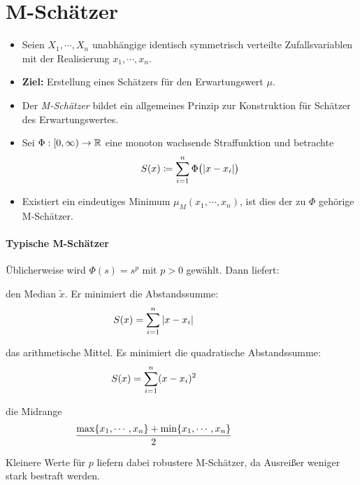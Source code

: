 	\section{M-Schätzer}
		\begin{itemize}
			\item Seien \( X_1, \cdots, X_n \) unabhängige identisch symmetrisch verteilte Zufallsvariablen mit der Realisierung \(x_1, \cdots, x_n\).
			\item \textbf{Ziel:} Erstellung eines Schätzers für den Erwartungswert \(\mu\).
			\item Der \textit{M-Schätzer} bildet ein allgemeines Prinzip zur Konstruktion für Schätzer des Erwartungswertes.
			\item Sei \( \Phi : [0, \infty) \rightarrow \mathbb{R} \) eine monoton wachsende Straffunktion und betrachte
				\begin{equation*}
					S(x) \coloneqq \sum_{i = 1}^{n} \Phi\big( \abs{x - x_i} \big)
				\end{equation*}
			\item Existiert ein eindeutiges Minimum \( \mu_M(x_1, \cdots, x_n) \), ist dies der zu \(\Phi\) gehörige M-Schätzer.
		\end{itemize}

		\paragraph{Typische M-Schätzer}
			Üblicherweise wird \( \Phi(s) = s^p \) mit \( p > 0 \) gewählt. Dann liefert:
			\begin{description}[leftmargin = 2cm]
				\item[\( p = 1\)] den Median \( \tilde{x} \). Er minimiert die Abstandssumme:
					\begin{equation*}
						\hspace{-2cm} S(x) = \sum_{i = 1}^{n} \abs{x - x_i}
					\end{equation*}
				\item[\( p = 2 \)] das arithmetische Mittel. Es minimiert die quadratische Abstandssumme:
					\begin{equation*}
						\hspace{-2cm} S(x) = \sum_{i = 1}^{n} (x - x_i)^2
					\end{equation*}
				\item[\( p \rightarrow \infty \)] die Midrange
					\begin{equation*}
						\hspace{-2cm} \frac{\max \{ x_1, \cdots, x_n \} + \min \{ x_1, \cdots, x_n \}}{2}
					\end{equation*}
			\end{description}
			Kleinere Werte für \(p\) liefern dabei robustere M-Schätzer, da Ausreißer weniger stark bestraft werden.

